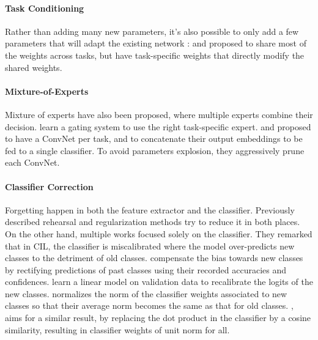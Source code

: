 \paragraph{Task Conditioning} Rather than adding many new parameters, it's also possible to only add
a few parameters that will adapt the existing network \citep{rebuffi2017visualadapters}:
\cite{wen2020batchensemble} and \cite{sun2019metatransfer} proposed to share most of the weights
across tasks, but have task-specific weights that directly modify the shared weights.

\paragraph{Mixture-of-Experts} Mixture of experts \citep{masoudnia2014mixture} have also been
proposed, where multiple experts combine their decision. \cite{aljundi2017experts} learn a gating
system to use the right task-specific expert. \cite{yan2021der} and \cite{li2021preserve} proposed
to have a \ac{ConvNet} per task, and to concatenate their output embeddings to be fed to a single
classifier. To avoid parameters explosion, they aggressively prune each \ac{ConvNet}.

\paragraph{Classifier Correction} Forgetting happen in both the feature extractor and the
classifier. Previously described rehearsal and regularization methods try to reduce it in both
places. On the other hand, multiple works focused solely on the classifier. They remarked that in
\acf{CIL}, the classifier is miscalibrated \citep{guo2017miscalibration} where the model
over-predicts new classes to the detriment of old classes. \cite{belouadah2019il2m} compensate the
bias towards new classes by rectifying predictions of past classes using their recorded accuracies
and confidences. \cite{wu2019bias_correction} learn a linear model on validation data to recalibrate
the logits of the new classes. \cite{zhao2020weightalignement} normalizes the norm of the classifier
weights associated to new classes so that their average norm becomes the same as that for old
classes. \cite{hou2019ucir}, aims for a similar result, by replacing the dot product in the
classifier by a cosine similarity, resulting in classifier weights of unit norm for all.

